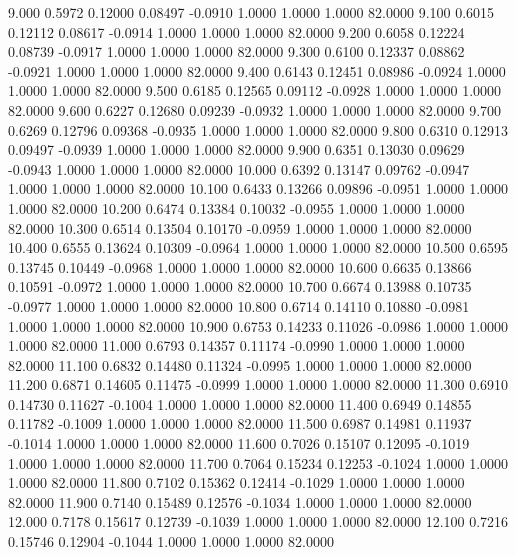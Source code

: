    9.000   0.5972   0.12000   0.08497  -0.0910   1.0000   1.0000   1.0000  82.0000
   9.100   0.6015   0.12112   0.08617  -0.0914   1.0000   1.0000   1.0000  82.0000
   9.200   0.6058   0.12224   0.08739  -0.0917   1.0000   1.0000   1.0000  82.0000
   9.300   0.6100   0.12337   0.08862  -0.0921   1.0000   1.0000   1.0000  82.0000
   9.400   0.6143   0.12451   0.08986  -0.0924   1.0000   1.0000   1.0000  82.0000
   9.500   0.6185   0.12565   0.09112  -0.0928   1.0000   1.0000   1.0000  82.0000
   9.600   0.6227   0.12680   0.09239  -0.0932   1.0000   1.0000   1.0000  82.0000
   9.700   0.6269   0.12796   0.09368  -0.0935   1.0000   1.0000   1.0000  82.0000
   9.800   0.6310   0.12913   0.09497  -0.0939   1.0000   1.0000   1.0000  82.0000
   9.900   0.6351   0.13030   0.09629  -0.0943   1.0000   1.0000   1.0000  82.0000
  10.000   0.6392   0.13147   0.09762  -0.0947   1.0000   1.0000   1.0000  82.0000
  10.100   0.6433   0.13266   0.09896  -0.0951   1.0000   1.0000   1.0000  82.0000
  10.200   0.6474   0.13384   0.10032  -0.0955   1.0000   1.0000   1.0000  82.0000
  10.300   0.6514   0.13504   0.10170  -0.0959   1.0000   1.0000   1.0000  82.0000
  10.400   0.6555   0.13624   0.10309  -0.0964   1.0000   1.0000   1.0000  82.0000
  10.500   0.6595   0.13745   0.10449  -0.0968   1.0000   1.0000   1.0000  82.0000
  10.600   0.6635   0.13866   0.10591  -0.0972   1.0000   1.0000   1.0000  82.0000
  10.700   0.6674   0.13988   0.10735  -0.0977   1.0000   1.0000   1.0000  82.0000
  10.800   0.6714   0.14110   0.10880  -0.0981   1.0000   1.0000   1.0000  82.0000
  10.900   0.6753   0.14233   0.11026  -0.0986   1.0000   1.0000   1.0000  82.0000
  11.000   0.6793   0.14357   0.11174  -0.0990   1.0000   1.0000   1.0000  82.0000
  11.100   0.6832   0.14480   0.11324  -0.0995   1.0000   1.0000   1.0000  82.0000
  11.200   0.6871   0.14605   0.11475  -0.0999   1.0000   1.0000   1.0000  82.0000
  11.300   0.6910   0.14730   0.11627  -0.1004   1.0000   1.0000   1.0000  82.0000
  11.400   0.6949   0.14855   0.11782  -0.1009   1.0000   1.0000   1.0000  82.0000
  11.500   0.6987   0.14981   0.11937  -0.1014   1.0000   1.0000   1.0000  82.0000
  11.600   0.7026   0.15107   0.12095  -0.1019   1.0000   1.0000   1.0000  82.0000
  11.700   0.7064   0.15234   0.12253  -0.1024   1.0000   1.0000   1.0000  82.0000
  11.800   0.7102   0.15362   0.12414  -0.1029   1.0000   1.0000   1.0000  82.0000
  11.900   0.7140   0.15489   0.12576  -0.1034   1.0000   1.0000   1.0000  82.0000
  12.000   0.7178   0.15617   0.12739  -0.1039   1.0000   1.0000   1.0000  82.0000
  12.100   0.7216   0.15746   0.12904  -0.1044   1.0000   1.0000   1.0000  82.0000
